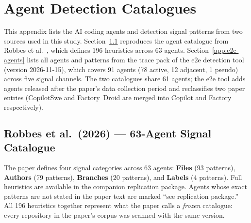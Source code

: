 
\chapter{Agent Detection Catalogues}
\label{app:agents}

This appendix lists the AI coding agents and detection signal patterns from two sources used in this study. Section~\ref{app:paper-agents} reproduces the agent catalogue from Robbes et al.~\cite{robbesAgenticMuch2026}, which defines 196 heuristics across 63 agents. Section~\ref{app:e2e-agents} lists all agents and patterns from the trace pack of the e2e detection tool (version 2026-11-15), which covers 91 agents (78 active, 12 adjacent, 1 pseudo) across five signal channels. The two catalogues share 61 agents; the e2e tool adds agents released after the paper's data collection period and reclassifies two paper entries (CopilotSwe and Factory~Droid are merged into Copilot and Factory respectively).

\section{Robbes et al.\ (2026) --- 63-Agent Signal Catalogue}
\label{app:paper-agents}

The paper defines four signal categories across 63 agents: \textbf{Files} (93 patterns), \textbf{Authors} (79 patterns), \textbf{Branches} (20 patterns), and \textbf{Labels} (4 patterns). Full heuristics are available in the companion replication package. Agents whose exact patterns are not stated in the paper text are marked ``see replication package.'' All 196 heuristics together represent what the paper calls a \emph{frozen} catalogue: every repository in the paper's corpus was scanned with the same version.

